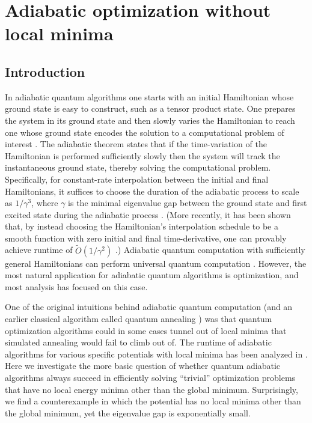 \chapter{Adiabatic optimization without local minima}

\section{Introduction}

In adiabatic quantum algorithms one starts with an initial Hamiltonian
whose ground state is easy to construct, such as a tensor product
state. One prepares the system in its ground state and then 
slowly varies the Hamiltonian to reach one whose ground state encodes
the solution to a computational problem of interest
\cite{Farhi_science}. The adiabatic theorem states that if the 
time-variation of the Hamiltonian is performed sufficiently slowly
then the system will track the instantaneous ground state, thereby
solving the computational problem. Specifically, for constant-rate
interpolation between the initial and final Hamiltonians, it suffices
to choose the duration of the adiabatic process to scale as
$1/\gamma^3$, where $\gamma$ is the minimal eigenvalue gap between the
ground state and first excited state during the adiabatic process
\cite{JRS07}. (More recently, it has been shown that, by instead
choosing the Hamiltonian's interpolation schedule to be a smooth
function with zero initial and final time-derivative, one can
provably achieve runtime of $\widetilde{O}(1/\gamma^2)$
\cite{Elgart_Hagedorn}.) Adiabatic quantum computation with
sufficiently general Hamiltonians can perform universal quantum
computation \cite{ADKLLR07}. However, the most natural application for
adiabatic quantum algorithms is optimization, and most analysis has
focused on this case.

One of the original intuitions behind adiabatic quantum computation
(and an earlier classical algorithm called quantum annealing
\cite{FGSSD94}) was that quantum optimization algorithms could in some
cases tunnel out of local minima that simulated annealing would fail
to climb out of. The runtime of adiabatic algorithms for various
specific potentials with local minima has been analyzed in \cite{R04,
  DMV01, FGG02, VDV03, aminchoi, Amin}. Here we investigate the more basic
question of whether quantum adiabatic algorithms always succeed in
efficiently solving ``trivial'' optimization problems that have no
local energy minima other than the global minimum. Surprisingly, we
find a counterexample in which the potential has no local minima other
than the global minimum, yet the eigenvalue gap is exponentially
small.

